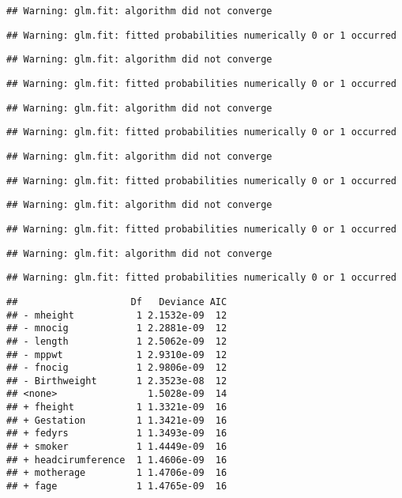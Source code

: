 \documentclass[]{article}
\begin{document}
\begin{verbatim}
## Warning: glm.fit: algorithm did not converge
\end{verbatim}

\begin{verbatim}
## Warning: glm.fit: fitted probabilities numerically 0 or 1 occurred
\end{verbatim}

\begin{verbatim}
## Warning: glm.fit: algorithm did not converge
\end{verbatim}

\begin{verbatim}
## Warning: glm.fit: fitted probabilities numerically 0 or 1 occurred
\end{verbatim}

\begin{verbatim}
## Warning: glm.fit: algorithm did not converge
\end{verbatim}

\begin{verbatim}
## Warning: glm.fit: fitted probabilities numerically 0 or 1 occurred
\end{verbatim}

\begin{verbatim}
## Warning: glm.fit: algorithm did not converge
\end{verbatim}

\begin{verbatim}
## Warning: glm.fit: fitted probabilities numerically 0 or 1 occurred
\end{verbatim}

\begin{verbatim}
## Warning: glm.fit: algorithm did not converge
\end{verbatim}

\begin{verbatim}
## Warning: glm.fit: fitted probabilities numerically 0 or 1 occurred
\end{verbatim}

\begin{verbatim}
## Warning: glm.fit: algorithm did not converge
\end{verbatim}

\begin{verbatim}
## Warning: glm.fit: fitted probabilities numerically 0 or 1 occurred
\end{verbatim}

\begin{verbatim}
##                    Df   Deviance AIC
## - mheight           1 2.1532e-09  12
## - mnocig            1 2.2881e-09  12
## - length            1 2.5062e-09  12
## - mppwt             1 2.9310e-09  12
## - fnocig            1 2.9806e-09  12
## - Birthweight       1 2.3523e-08  12
## <none>                1.5028e-09  14
## + fheight           1 1.3321e-09  16
## + Gestation         1 1.3421e-09  16
## + fedyrs            1 1.3493e-09  16
## + smoker            1 1.4449e-09  16
## + headcirumference  1 1.4606e-09  16
## + motherage         1 1.4706e-09  16
## + fage              1 1.4765e-09  16
\end{verbatim}
\end{document}
